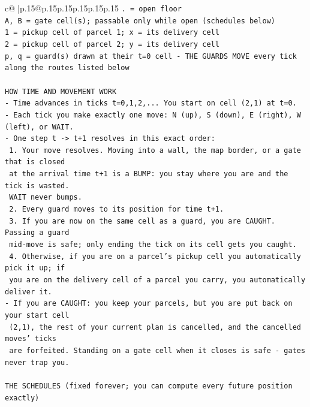 \documentclass{article}
\begin{document}
{\begin{supertabular}{c@{$\;$}|p{.15\linewidth}@{}p{.15\linewidth}p{.15\linewidth}p{.15\linewidth}p{.15\linewidth}p{.15\linewidth}}
{{{\texttt{. = open floor} \\
\texttt{A, B = gate cell(s); passable only while open (schedules below)} \\
\texttt{1 = pickup cell of parcel 1; x = its delivery cell} \\
\texttt{2 = pickup cell of parcel 2; y = its delivery cell} \\
\texttt{p, q = guard(s) drawn at their t=0 cell {-} THE GUARDS MOVE every tick along the routes listed below} \\
\\ 
\texttt{HOW TIME AND MOVEMENT WORK} \\
\texttt{{-} Time advances in ticks t=0,1,2,... You start on cell (2,1) at t=0.} \\
\texttt{{-} Each tick you make exactly one move: N (up), S (down), E (right), W (left), or WAIT.} \\
\texttt{{-} One step t {-}> t+1 resolves in this exact order:} \\
\texttt{  1. Your move resolves. Moving into a wall, the map border, or a gate that is closed} \\
\texttt{     at the arrival time t+1 is a BUMP: you stay where you are and the tick is wasted.} \\
\texttt{     WAIT never bumps.} \\
\texttt{  2. Every guard moves to its position for time t+1.} \\
\texttt{  3. If you are now on the same cell as a guard, you are CAUGHT. Passing a guard} \\
\texttt{     mid{-}move is safe; only ending the tick on its cell gets you caught.} \\
\texttt{  4. Otherwise, if you are on a parcel's pickup cell you automatically pick it up; if} \\
\texttt{     you are on the delivery cell of a parcel you carry, you automatically deliver it.} \\
\texttt{{-} If you are CAUGHT: you keep your parcels, but you are put back on your start cell} \\
\texttt{  (2,1), the rest of your current plan is cancelled, and the cancelled moves' ticks} \\
\texttt{  are forfeited. Standing on a gate cell when it closes is safe {-} gates never trap you.} \\
\\ 
\texttt{THE SCHEDULES (fixed forever; you can compute every future position exactly)} \\
}}}
\end{supertabular}}
\end{document}
